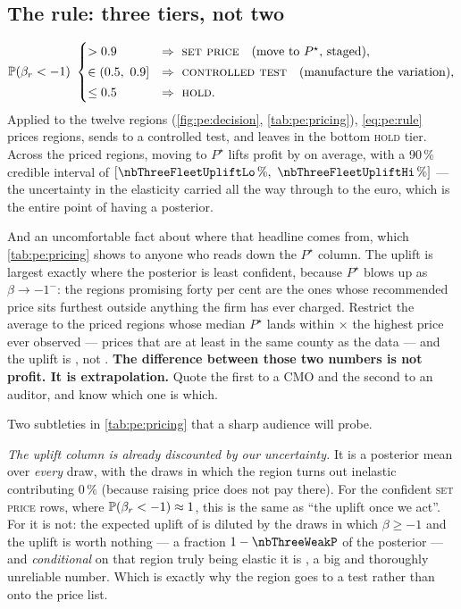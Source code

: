 \subsection*{The rule: three tiers, not two}

\begin{equation}
  \operatorname{\mathbb{P}}(\beta_r < -1)\ \begin{cases}
    > 0.9 & \Rightarrow\ \textsc{set price} \quad\text{(move to $P^\star$, staged)},\\[2pt]
    \in (0.5,\ 0.9] & \Rightarrow\ \textsc{controlled test} \quad\text{(manufacture the variation)},\\[2pt]
    \le 0.5 & \Rightarrow\ \textsc{hold}.
  \end{cases}
  \label{eq:pe:rule}
\end{equation}
%
Applied to the twelve regions (\cref{fig:pe:decision}, \cref{tab:pe:pricing}), \cref{eq:pe:rule}
prices \nbThreeNSet{} regions, sends \nbThreeNTest{} to a controlled test, and leaves
\nbThreeNHold{} in the bottom \textsc{hold} tier. Across the priced regions, moving to $P^\star$ lifts profit by
\pc{\nbThreeFleetUplift} on average, with a 90\,\% credible interval of
$[\pc{\nbThreeFleetUpliftLo},\ \pc{\nbThreeFleetUpliftHi}]$ --- the uncertainty in the elasticity
carried all the way through to the euro, which is the entire point of having a posterior.

And an uncomfortable fact about where that headline comes from, which \cref{tab:pe:pricing} shows to
anyone who reads down the $P^\star$ column. The uplift is largest exactly where the posterior is
least confident, because $P^\star$ blows up as $\beta \to -1^{-}$: the regions promising forty per
cent are the ones whose recommended price sits furthest outside anything the firm has ever charged.
Restrict the average to the \nbThreeNInband{} priced regions whose median $P^\star$ lands within
\nbThreeBandMult$\times$ the highest price ever observed --- prices that are at least in the same
county as the data --- and the uplift is \pc{\nbThreeUpliftInband}, not \pc{\nbThreeFleetUplift}.
\textbf{The difference between those two numbers is not profit. It is extrapolation.} Quote the
first to a CMO and the second to an auditor, and know which one is which.




Two subtleties in \cref{tab:pe:pricing} that a sharp audience will probe.

\emph{The uplift column is already discounted by our uncertainty.} It is a posterior mean over
\emph{every} draw, with the draws in which the region turns out inelastic contributing $0\,\%$
(because raising price does not pay there). For the confident \textsc{set price} rows, where
$\operatorname{\mathbb{P}}(\beta_r < -1) \approx 1$, this is the same as ``the uplift once we act''. For
\nbThreeWeakRegion{} it is not: the expected uplift of \pc{\nbThreeWeakUplift} is diluted by the
draws in which $\beta \ge -1$ and the uplift is worth nothing --- a fraction
$1 - \nbThreeWeakP$ of the posterior --- and \emph{conditional} on that region truly being elastic
it is \pc{\nbThreeWeakUpliftCond}, a big and thoroughly unreliable number. Which is exactly why the
region goes to a test rather than onto the price list.


